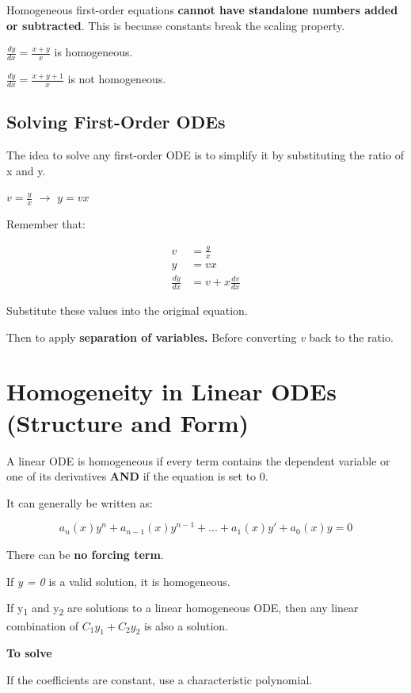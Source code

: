 \documentclass[11pt]{article}
\begin{document}
Homogeneous first-order equations \textbf{cannot have standalone numbers added or subtracted}.
This is becuase constants break the scaling property.

\(\frac{dy}{dx} = \frac{x + y}{x}\) is homogeneous.

\(\frac{dy}{dx} = \frac{x + y + 1}{x}\) is not homogeneous.
\subsection{Solving First-Order ODEs}
\label{sec:org23de1bf}

The idea to solve any first-order ODE is to simplify it by substituting the ratio of x and y.

\(v = \frac{y}{x}\) \(\to\) \(y = vx\)

Remember that:


\begin{align}
v &= \frac{y}{x} \\
y &= vx \\
\frac{dy}{dx} &= v + x\frac{dv}{dx}
\end{align}

Substitute these values into the original equation.

Then to apply \textbf{separation of variables.} Before converting \emph{v} back to the ratio.
\section{Homogeneity in Linear ODEs (Structure and Form)}
\label{sec:org9fa4af8}

A linear ODE is homogeneous if every term contains the dependent variable or one of its derivatives \textbf{AND} if the equation is set to 0.

It can generally be written as:

\[
a_n(x)y^{n} + a_{n-1}(x)y^{n-1}+...+a_1_{}(x)y'+ a_0_{}(x)y = 0
\]

There can be \textbf{no forcing term}.

If \emph{y = 0} is a valid solution, it is homogeneous.

If y\textsubscript{1} and y\textsubscript{2} are solutions to a linear homogeneous ODE, then any linear combination of \(C_1 y_1 + C_2 y_2\) is also a solution.

\textbf{To solve}

If the coefficients are constant, use a characteristic polynomial.
\end{document}
